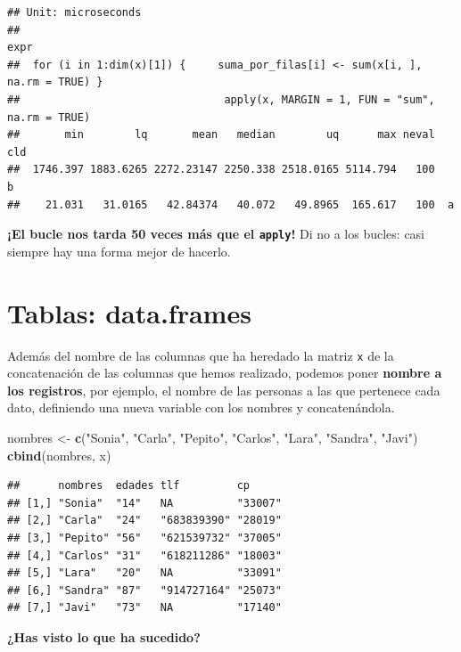 \documentclass[11pt,]{book}
\newenvironment{Shaded}{\begin{snugshade}}{\end{snugshade}}
\newcommand{\KeywordTok}[1]{\textcolor[rgb]{0.27,0.27,0.27}{\textbf{#1}}}
\newcommand{\NormalTok}[1]{#1}
\newcommand{\StringTok}[1]{\textcolor[rgb]{0.5,0.5,0.5}{#1}}
\begin{document}
\begin{verbatim}
## Unit: microseconds
##                                                                           expr
##  for (i in 1:dim(x)[1]) {     suma_por_filas[i] <- sum(x[i, ], na.rm = TRUE) }
##                                apply(x, MARGIN = 1, FUN = "sum", na.rm = TRUE)
##       min        lq       mean   median        uq      max neval cld
##  1746.397 1883.6265 2272.23147 2250.338 2518.0165 5114.794   100   b
##    21.031   31.0165   42.84374   40.072   49.8965  165.617   100  a
\end{verbatim}

\textbf{¡El bucle nos tarda 50 veces más que el \texttt{apply}!} Di no a los bucles: casi siempre hay una forma mejor de hacerlo.

\hypertarget{tablas-data.frames}{%
\section{Tablas: data.frames}\label{tablas-data.frames}}

Además del nombre de las columnas que ha heredado la matriz \texttt{x} de la concatenación de las columnas que hemos realizado, podemos poner \textbf{nombre a los registros}, por ejemplo, el nombre de las personas a las que pertenece cada dato, definiendo una nueva variable con los nombres y concatenándola.

\begin{Shaded}
\begin{Highlighting}[]
\NormalTok{nombres <-}\StringTok{ }\KeywordTok{c}\NormalTok{(}\StringTok{"Sonia"}\NormalTok{, }\StringTok{"Carla"}\NormalTok{, }\StringTok{"Pepito"}\NormalTok{, }\StringTok{"Carlos"}\NormalTok{, }\StringTok{"Lara"}\NormalTok{, }\StringTok{"Sandra"}\NormalTok{, }\StringTok{"Javi"}\NormalTok{)}
\KeywordTok{cbind}\NormalTok{(nombres, x)}
\end{Highlighting}
\end{Shaded}

\begin{verbatim}
##      nombres  edades tlf         cp     
## [1,] "Sonia"  "14"   NA          "33007"
## [2,] "Carla"  "24"   "683839390" "28019"
## [3,] "Pepito" "56"   "621539732" "37005"
## [4,] "Carlos" "31"   "618211286" "18003"
## [5,] "Lara"   "20"   NA          "33091"
## [6,] "Sandra" "87"   "914727164" "25073"
## [7,] "Javi"   "73"   NA          "17140"
\end{verbatim}

\textbf{¿Has visto lo que ha sucedido?}
\end{document}
